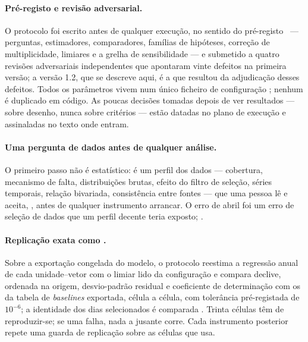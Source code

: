 \paragraph{Pré-registo e revisão adversarial.} O protocolo foi escrito
antes de qualquer execução, no sentido do pré-registo~\cite{Nosek2018} --- perguntas, estimadores, comparadores,
famílias de hipóteses, correção de multiplicidade, limiares e a grelha de
sensibilidade --- e submetido a quatro revisões adversariais independentes
que apontaram vinte defeitos na primeira
versão; a versão 1.2, que se descreve aqui, é a que resultou da
adjudicação desses defeitos. Todos os parâmetros vivem num único ficheiro de
configuração ; nenhum é duplicado em
código. As poucas decisões tomadas depois de ver resultados --- sobre desenho,
nunca sobre critérios --- estão datadas no plano de execução e assinaladas
no texto onde entram.

\paragraph{Uma pergunta de dados antes de qualquer análise.} O primeiro
passo não é estatístico: é um perfil dos dados --- cobertura, mecanismo de
falta, distribuições brutas, efeito do filtro de seleção, séries temporais,
relação bivariada, consistência entre fontes --- que uma pessoa lê e
aceita, , antes de qualquer instrumento arrancar. O erro de abril foi um
erro de seleção de dados que um perfil decente teria exposto; .

\paragraph{Replicação exata como .} Sobre a exportação
congelada do modelo, o protocolo reestima a regressão anual de cada
unidade--vetor com o limiar lido da configuração e compara declive,
ordenada na origem, desvio-padrão residual e coeficiente de determinação
com os da tabela de \emph{baselines} exportada, célula a célula, com
tolerância pré-registada de $10^{-6}$; a identidade dos dias selecionados
é comparada . Trinta células têm de
reproduzir-se; se uma falha, nada a jusante corre. Cada instrumento
posterior repete uma guarda de replicação sobre as células que usa.

